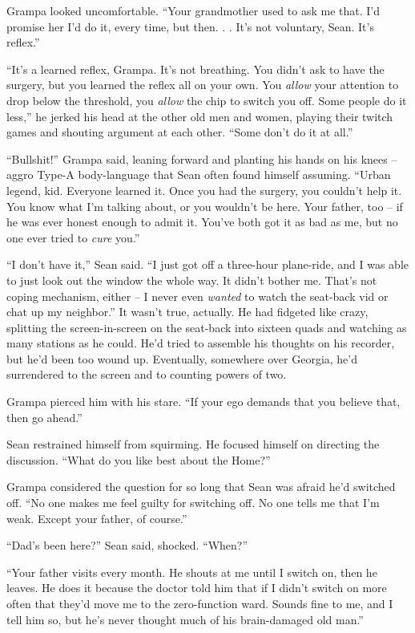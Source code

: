 Grampa looked uncomfortable. “Your grandmother used to ask me that. 
I'd promise her I'd do it, every time, but then. . . It's not 
voluntary, Sean. It's reflex.”

“It's a learned reflex, Grampa. It's not breathing. You didn't ask to 
have the surgery, but you learned the reflex all on your own. You 
\emph{allow} your attention to drop below the threshold, you 
\emph{allow} the chip to switch you off. Some people do it less,” he 
jerked his head at the other old men and women, playing their twitch 
games and shouting argument at each other. “Some don't do it at 
all.”

“Bullshit!” Grampa said, leaning forward and planting his hands on 
his knees -- aggro Type-A body-language that Sean often found himself 
assuming. “Urban legend, kid. Everyone learned it. Once you had the 
surgery, you couldn't help it. You know what I'm talking about, or you 
wouldn't be here. Your father, too -- if he was ever honest enough to 
admit it. You've both got it as bad as me, but no one ever tried to 
\emph{cure} you.”

“I don't have it,” Sean said. “I just got off a three-hour 
plane-ride, and I was able to just look out the window the whole way. 
It didn't bother me. That's not coping mechanism, either -- I never 
even \emph{wanted} to watch the seat-back vid or chat up my 
neighbor.” It wasn't true, actually. He had fidgeted like crazy, 
splitting the screen-in-screen on the seat-back into sixteen quads and 
watching as many stations as he could. He'd tried to assemble his 
thoughts on his recorder, but he'd been too wound up. Eventually, 
somewhere over Georgia, he'd surrendered to the screen and to counting 
powers of two.

Grampa pierced him with his stare. “If your ego demands that you 
believe that, then go ahead.”

Sean restrained himself from squirming. He focused himself on directing 
the discussion. “What do you like best about the Home?”

Grampa considered the question for so long that Sean was afraid he'd 
switched off. “No one makes me feel guilty for switching off. No one 
tells me that I'm weak. Except your father, of course.”

“Dad's been here?” Sean said, shocked. “When?”

“Your father visits every month. He shouts at me until I switch on, 
then he leaves. He does it because the doctor told him that if I didn't 
switch on more often that they'd move me to the zero-function ward. 
Sounds fine to me, and I tell him so, but he's never thought much of 
his brain-damaged old man.”

